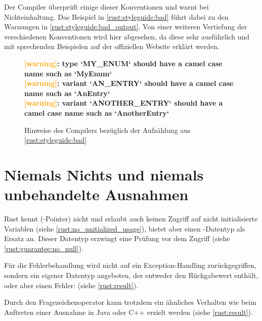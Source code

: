 Der Compiler überprüft einige dieser Konventionen und warnt bei Nichteinhaltung.
Das Beispiel in \autoref{rust:styleguide:bad} führt dabei zu den Warnungen in \autoref{rust:styleguide:bad_output}.
Von einer weiteren Vertiefung der verschiedenen Konventionen wird hier abgesehen, da diese sehr ausführlich und mit sprechenden Beispielen auf der offiziellen Website erklärt werden.

\begin{figure}[H]
	\begin{tcolorbox}[colback=codeBackground,boxrule=0pt,arc=0pt]
	\begin{scriptsize}
		\textbf{\textcolor{orange}{[warning]}: type `MY\_ENUM` should have a camel case name such as `MyEnum`} \\
		\textbf{\textcolor{orange}{[warning]}: variant `AN\_ENTRY` should have a camel case name such as `AnEntry`} \\
		\textbf{\textcolor{orange}{[warning]}: variant `ANOTHER\_ENTRY` should have a camel case name such as `AnotherEntry`}
	\end{scriptsize}
	\end{tcolorbox}
	\caption{Hinweise des Compilers bezüglich der Aufzählung aus \autoref{rust:styleguide:bad}}
	\label{rust:styleguide:bad_output}
\end{figure}


\section{Niemals Nichts und niemals unbehandelte Ausnahmen}
\label{rust:no_null}

Rust kennt (-Pointer) nicht und erlaubt auch keinen Zugriff auf nicht initialisierte Variablen (siehe \autoref{rust:no_unitialized_usage}), bietet aber einen -Datentyp als Ersatz an.
Dieser Datentyp erzwingt eine Prüfung vor dem Zugriff (siehe \autoref{rust:guarantee:no_null}).

Für die Fehlerbehandlung wird nicht auf ein Exception-Handling zurückgegriffen, sondern ein eigener Datentyp angeboten, der entweder den Rückgabewert enthält, oder aber einen Fehler:  (siehe \autoref{rust:result}).

Durch den Fragezeichenoperator kann trotzdem ein ähnliches Verhalten wie beim Auftreten einer Ausnahme in Java oder C++ erzielt werden (siehe \autoref{rust:result}).

